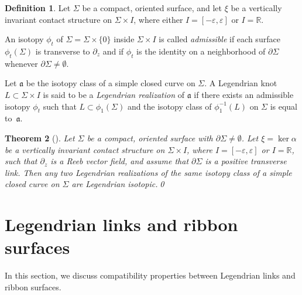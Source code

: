 \documentclass{amsart}
\numberwithin{equation}{section}
\numberwithin{figure}{section}
\newtheorem{theorem}{Theorem}[section]
\theoremstyle{definition}
\newtheorem{definition}[theorem]{Definition}
\theoremstyle{remark}
\newcommand{\R}{\mathbb{R}}
\let\oldSigma\Sigma
\renewcommand{\Sigma}{\oldSigma}
\let\oldalpha\alpha %
\renewcommand{\alpha}{\oldalpha}
\let\olddxi\xi %
\renewcommand{\xi}{\olddxi}
\renewcommand{\aa}{\mathfrak{a}}
\begin{document}
\begin{definition}\label{def:leg_real}
    Let $\Sigma$ be a compact, oriented surface, and let $\xi$ be a vertically invariant contact structure on $\Sigma\times I$, where either $I=[-\varepsilon,\varepsilon]$ or $I=\R$.
    
    An isotopy $\phi_t$ of $\Sigma=\Sigma\times\{0\}$ inside $\Sigma\times I$ is called \emph{admissible} if each surface $\phi_t(\Sigma)$ is transverse to $\partial_z$ and if $\phi_t$ is the identity on a neighborhood of $\partial\Sigma$ whenever $\partial\Sigma\neq\emptyset$.
    
    Let $\aa$ be the isotopy class of a simple closed curve on $\Sigma$. A Legendrian knot $L\subset\Sigma\times I$ is said to be a \emph{Legendrian realization} of $\aa$ if there exists an admissible isotopy $\phi_t$ such that $L\subset\phi_1(\Sigma)$ and the isotopy class of $\phi_1^{-1}(L)$ on $\Sigma$ is equal to~$\aa$.
\end{definition}

\begin{theorem}[{\cite[Theorem~3.4]{StenhedeAlgorithm}}]\label{thm:uniqueness_ribbon}
    Let $\Sigma$ be a compact, oriented surface with $\partial\Sigma\neq\emptyset$. Let $\xi=\ker\alpha$ be a vertically invariant contact structure on $\Sigma\times I$, where $I=[-\varepsilon,\varepsilon]$ or $I=\R$, such that $\partial_z$ is a Reeb vector field, and assume that $\partial\Sigma$ is a positive transverse link. Then any two Legendrian realizations of the same isotopy class of a simple closed curve on $\Sigma$ are Legendrian isotopic.\qed
\end{theorem}


\section{Legendrian links and ribbon surfaces}\label{sec:Leglinkandribbon}

In this section, we discuss compatibility properties between Legendrian links and ribbon surfaces. 
\end{document}
